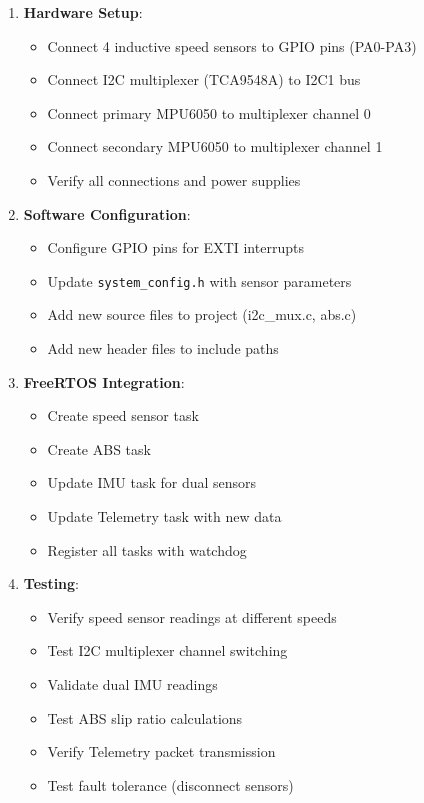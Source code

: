 \documentclass[11pt,a4paper]{article}
\begin{document}
\begin{enumerate}
    \item \textbf{Hardware Setup}:
    \begin{itemize}
        \item Connect 4 inductive speed sensors to GPIO pins (PA0-PA3)
        \item Connect I2C multiplexer (TCA9548A) to I2C1 bus
        \item Connect primary MPU6050 to multiplexer channel 0
        \item Connect secondary MPU6050 to multiplexer channel 1
        \item Verify all connections and power supplies
    \end{itemize}
    
    \item \textbf{Software Configuration}:
    \begin{itemize}
        \item Configure GPIO pins for EXTI interrupts
        \item Update \texttt{system\_config.h} with sensor parameters
        \item Add new source files to project (i2c\_mux.c, abs.c)
        \item Add new header files to include paths
    \end{itemize}
    
    \item \textbf{FreeRTOS Integration}:
    \begin{itemize}
        \item Create speed sensor task
        \item Create ABS task
        \item Update IMU task for dual sensors
        \item Update Telemetry task with new data
        \item Register all tasks with watchdog
    \end{itemize}
    
    \item \textbf{Testing}:
    \begin{itemize}
        \item Verify speed sensor readings at different speeds
        \item Test I2C multiplexer channel switching
        \item Validate dual IMU readings
        \item Test ABS slip ratio calculations
        \item Verify Telemetry packet transmission
        \item Test fault tolerance (disconnect sensors)
    \end{itemize}
\end{enumerate}
\end{document}

